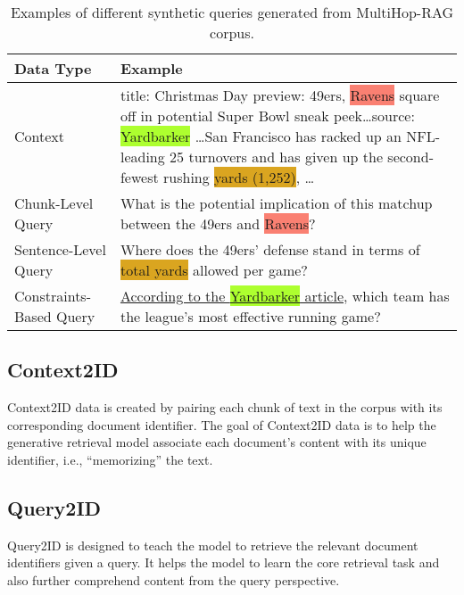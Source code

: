 \begin{table*}[htbp]
    \centering
    \small
    \begin{tabular}{lp{}}
        \toprule
        \textbf{Data Type} & \textbf{Example} \\
        \midrule
        Context & title: Christmas Day preview: \colorbox{Apricot}{49ers}, \colorbox{Salmon}{Ravens} square off in potential Super Bowl sneak peek\ldots source: \colorbox{GreenYellow}{Yardbarker} \ldots \colorbox{Apricot}{San Francisco} has racked up an NFL-leading 25 turnovers and has given up the second-fewest rushing \colorbox{Goldenrod}{yards (1,252)}, \ldots \\
        Chunk-Level Query & What is the potential implication of this matchup between the \colorbox{Apricot}{49ers} and \colorbox{Salmon}{Ravens}? \\
        Sentence-Level Query &  Where does the \colorbox{Apricot}{49ers}' defense stand in terms of \colorbox{Goldenrod}{total yards} allowed per game? \\
        Constraints-Based Query & \underline{According to the \colorbox{GreenYellow}{Yardbarker} article}, which team has the league's most effective running game?\\%
        \bottomrule
    \end{tabular}
    \caption{Examples of different synthetic queries generated from MultiHop-RAG corpus.} %
    \label{tab:data_type_example}
    \vspace{-0.5em}
\end{table*}

\subsection{Context2ID}
Context2ID data is created by pairing each chunk of text in the corpus with its corresponding document identifier. The goal of Context2ID data is to help the generative retrieval model associate each document's content with its unique identifier, i.e., ``memorizing'' the text.

\subsection{Query2ID}
Query2ID is designed to teach the model to retrieve the relevant document identifiers given a query. It helps the model to learn the core retrieval task and also further comprehend content from the query perspective.

